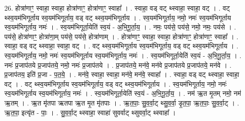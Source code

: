 \documentclass[17pt]{extarticle}
\begin{document}
26. होत्रा॑णाꣳ॒॒ स्वाहा॒ स्वाहा॒ होत्रा॑णाꣳ॒॒ होत्रा॑णाꣳ॒॒ स्वाहा᳚ । . स्वाहा॒ वड् वट् थ्स्वाहा॒ स्वाहा॒ वट् । . वट् थ्स्व॒यम॑भिगूर्ताय स्व॒यम॑भिगूर्ताय॒ वड् वट् थ्स्व॒यम॑भिगूर्ताय । . स्व॒यम॑भिगूर्ताय॒ नमो॒ नमः॑ स्व॒यम॑भिगूर्ताय स्व॒यम॑भिगूर्ताय॒ नमः॑ । . स्व॒यम॑भिगूर्ता॒येति॑ स्व॒यं - अ॒भि॒गू॒र्ता॒य॒ । . नमः॒ पय॑से॒ पय॑से॒ नमो॒ नमः॒ पय॑से । . पय॑से॒ होत्रा॑णाꣳ॒॒ होत्रा॑णा॒म् पय॑से॒ पय॑से॒ होत्रा॑णाम् । . होत्रा॑णाꣳ॒॒ स्वाहा॒ स्वाहा॒ होत्रा॑णाꣳ॒॒ होत्रा॑णाꣳ॒॒ स्वाहा᳚ । . स्वाहा॒ वड् वट् थ्स्वाहा॒ स्वाहा॒ वट् । . वट् थ्स्व॒यम॑भिगूर्ताय स्व॒यम॑भिगूर्ताय॒ वड् वट् थ्स्व॒यम॑भिगूर्ताय । . स्व॒यम॑भिगूर्ताय॒ नमो॒ नमः॑ स्व॒यम॑भिगूर्ताय स्व॒यम॑भिगूर्ताय॒ नमः॑ । . स्व॒यम॑भिगूर्ता॒येति॑ स्व॒यं - अ॒भि॒गू॒र्ता॒य॒ । . नमः॑ प्र॒जाप॑तये प्र॒जाप॑तये॒ नमो॒ नमः॑ प्र॒जाप॑तये । . प्र॒जाप॑तये॒ मन॑वे॒ मन॑वे प्र॒जाप॑तये प्र॒जाप॑तये॒ मन॑वे । . प्र॒जाप॑तय॒ इति॑ प्र॒जा - प॒त॒ये॒ । . मन॑वे॒ स्वाहा॒ स्वाहा॒ मन॑वे॒ मन॑वे॒ स्वाहा᳚ । . स्वाहा॒ वड् वट् थ्स्वाहा॒ स्वाहा॒ वट् । . वट् थ्स्व॒यम॑भिगूर्ताय स्व॒यम॑भिगूर्ताय॒ वड् वट् थ्स्व॒यम॑भिगूर्ताय । . स्व॒यम॑भिगूर्ताय॒ नमो॒ नमः॑ स्व॒यम॑भिगूर्ताय स्व॒यम॑भिगूर्ताय॒ नमः॑ । . स्व॒यम॑भिगूर्ता॒येति॑ स्व॒यं - अ॒भि॒गू॒र्ता॒य॒ । . नम॑ ऋ॒त मृ॒तम् नमो॒ नम॑ ऋ॒तम् । . ऋ॒त मृ॑तपा ऋतपा ऋ॒त मृ॒त मृ॑तपाः । . ऋ॒त॒पाः॒ सु॒व॒र्वा॒ट् थ्सु॒व॒र्वा॒ डृ॒त॒पा॒ ऋ॒त॒पाः॒ सु॒व॒र्वा॒ट् । . ऋ॒त॒पा॒ इत्यृ॑त - पाः॒ । . सु॒व॒र्वा॒ट् थ्स्वाहा॒ स्वाहा॑ सुवर्वाट् थ्सुवर्वा॒ट् थ्स्वाहा᳚ । \newline
\end{document}

